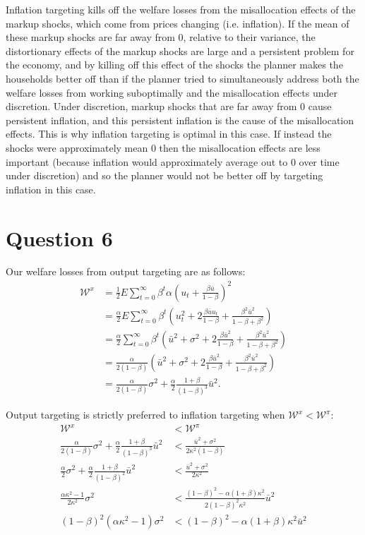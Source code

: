 \documentclass[11pt]{article} %
\begin{document}
Inflation targeting kills off the welfare losses from the misallocation effects of the markup shocks, which come from prices changing (i.e. inflation). If the mean of these markup shocks are far away from 0, relative to their variance,  the distortionary effects of the markup shocks are large and a persistent problem for the economy, and by killing off this effect of the shocks the planner makes the households better off than if the planner tried to simultaneously address both the welfare losses from working suboptimally and the misallocation effects under discretion. Under discretion, markup shocks that are far away from 0 cause persistent inflation, and this persistent inflation is the cause of the misallocation effects. This is why inflation targeting is optimal in this case. If instead the shocks were approximately mean $0$ then the misallocation effects are less important (because inflation would approximately average out to 0 over time under discretion) and so the planner would not be better off by targeting inflation in this case. %

\section{Question 6}
Our welfare losses from output targeting are as follows:
\begin{align*}
\mathcal{W}^{x} &= \frac{1}{2}E\sum_{t=0}^{\infty} \beta^t \alpha\left( u_t + \frac{\beta\bar{u}}{1-\beta} \right)^2\\
&= \frac{\alpha}{2}E\sum_{t=0}^{\infty} \beta^t \left( u_t^2 +2 \frac{\beta\bar{u}u_t}{1-\beta} + \frac{\beta^2\bar{u}^2}{1-\beta + \beta^2} \right) \\
&= \frac{\alpha}{2}\sum_{t=0}^{\infty} \beta^t \left( \bar{u}^2 + \sigma^2 +2 \frac{\beta\bar{u}^2}{1-\beta} + \frac{\beta^2\bar{u}^2}{1-\beta + \beta^2} \right) \\
&=\frac{\alpha}{2(1-\beta)} \left( \bar{u}^2 + \sigma^2 +2 \frac{\beta\bar{u}^2}{1-\beta} + \frac{\beta^2\bar{u}^2}{1-\beta + \beta^2} \right) \\
&=\frac{\alpha}{2(1-\beta)}\sigma^2 + \frac{\alpha}{2}\frac{1 + \beta }{(1-\beta)^3}\bar{u}^2.
\end{align*}

Output targeting is strictly preferred to inflation targeting when $\mathcal{W}^{x} < \mathcal{W}^{\pi}$:
\begin{align*}
\mathcal{W}^{x} &< \mathcal{W}^{\pi}\\
\frac{\alpha}{2(1-\beta)}\sigma^2 + \frac{\alpha}{2}\frac{1 + \beta }{(1-\beta)^3}\bar{u}^2 &< \frac{\bar{u}^2 + \sigma^2}{2\kappa^2(1-\beta)}\\
\frac{\alpha}{2}\sigma^2 + \frac{\alpha}{2}\frac{1 + \beta }{(1-\beta)^2}\bar{u}^2 &< \frac{\bar{u}^2 + \sigma^2}{2\kappa^2} \\
\frac{\alpha \kappa^2 - 1}{2 \kappa^2}\sigma^2 &< \frac{(1-\beta)^2-\alpha(1+\beta)\kappa^2 }{2(1-\beta)^2\kappa^2} \bar{u}^2\\
(1-\beta)^2(\alpha \kappa^2 - 1)\sigma^2 &< (1-\beta)^2-\alpha(1+\beta)\kappa^2  \bar{u}^2
\end{align*}
\end{document}
